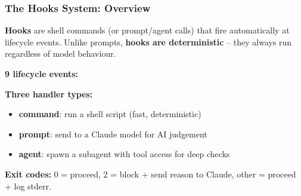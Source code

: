 \begin{frame}[fragile]\frametitle{The Hooks System: Overview}
\textbf{Hooks} are shell commands (or prompt/agent calls) that fire automatically at lifecycle events. Unlike prompts, \textbf{hooks are deterministic} -- they always run regardless of model behaviour.

\textbf{9 lifecycle events:}
\begin{center}
\end{center}

\textbf{Three handler types:}
  \begin{itemize}
    \item \textbf{command}: run a shell script (fast, deterministic)
    \item \textbf{prompt}: send to a Claude model for AI judgement
    \item \textbf{agent}: spawn a subagent with tool access for deep checks
  \end{itemize}

\textbf{Exit codes:} 0 = proceed, 2 = block + send reason to Claude, other = proceed + log stderr.
\end{frame}


